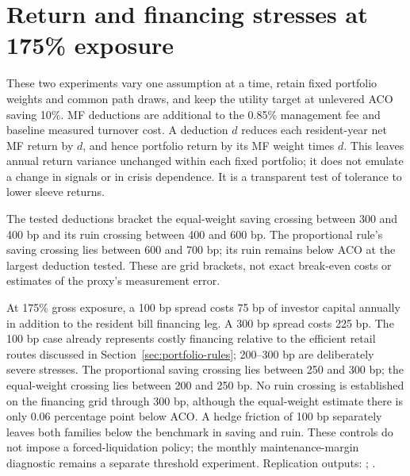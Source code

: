 \section{Return and financing stresses at 175\% exposure}
\label{app:review-cost-mf}
These two experiments vary one assumption at a time, retain fixed portfolio
weights and common path draws, and keep the utility target at unlevered ACO
saving 10\%. MF deductions are additional to the 0.85\% management fee and
baseline measured turnover cost. A deduction $d$ reduces each resident-year
net MF return by $d$, and hence portfolio return by its MF weight times $d$.
This leaves annual return variance unchanged within each fixed portfolio;
it does not emulate a change in signals or in crisis dependence. It is a
transparent test of tolerance to lower sleeve returns.

The tested deductions bracket the equal-weight saving crossing between
300 and 400 bp and its ruin crossing between 400 and 600 bp. The proportional
rule's saving crossing lies between 600 and 700 bp; its ruin remains below
ACO at the largest deduction tested. These are grid brackets, not exact
break-even costs or estimates of the proxy's measurement error.

At 175\% gross exposure, a 100 bp spread costs 75 bp of investor capital
annually in addition to the resident bill financing leg. A 300 bp spread costs
225 bp. The 100 bp case already represents costly financing relative to
the efficient retail routes discussed in Section~\ref{sec:portfolio-rules};
200--300 bp are deliberately severe stresses. The proportional saving crossing lies between 250 and 300 bp;
the equal-weight crossing lies between 200 and 250 bp. No ruin crossing is
established on the financing grid through 300 bp, although the equal-weight
estimate there is only 0.06 percentage point below ACO. A hedge friction of
100 bp separately leaves both families below the benchmark in saving and
ruin. These controls do not impose a forced-liquidation policy; the monthly
maintenance-margin diagnostic remains a separate threshold experiment.
Replication outputs: ;
.
